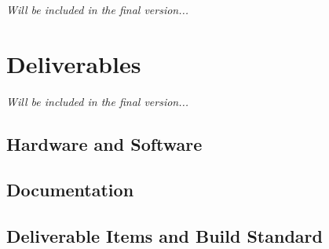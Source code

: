\textit{Will be included in the final version...}

\section{Deliverables}

\textit{Will be included in the final version...}

\subsection{Hardware and Software}

\subsection{Documentation}

\subsection{Deliverable Items and Build Standard}

